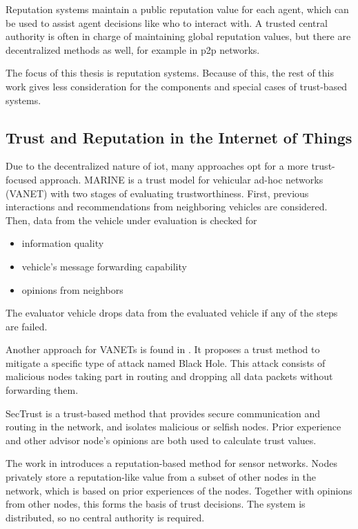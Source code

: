 \documentclass[%
    ]{\PathToTumTemplate/thesis/tum_thesis}
\begin{document}
Reputation systems maintain a public reputation value for each agent, which can be used to assist agent decisions like who to interact with.
A trusted central authority is often in charge of maintaining global reputation values, but there are decentralized methods as well, for example in \gls{p2p} networks\cite{kamvar_eigentrust_2003,kurdi_honestpeer_2015,keshavarz_uastrustchain_2020}.

The focus of this thesis is reputation systems.
Because of this, the rest of this work gives less consideration for the components and special cases of trust-based systems.



\subsection{Trust and Reputation in the Internet of Things}

Due to the decentralized nature of \gls{iot}, many approaches opt for a more trust-focused approach.
MARINE is a trust model for vehicular ad-hoc networks (VANET) with two stages of evaluating trustworthiness\cite{ahmad_marine_2020}.
First, previous interactions and recommendations from neighboring vehicles are considered.
Then, data from the vehicle under evaluation is checked for
\begin{itemize}
\item information quality
\item vehicle’s message forwarding capability
\item opinions from neighbors
\end{itemize}
The evaluator vehicle drops data from the evaluated vehicle if any of the steps are failed.

Another approach for VANETs is found in \cite{primiero_simulation_2018}.
It proposes a trust method to mitigate a specific type of attack named Black Hole.
This attack consists of malicious nodes taking part in routing and dropping all data packets without forwarding them.

SecTrust is a trust-based method that provides secure communication and routing in the network, and isolates malicious or selfish nodes\cite{airehrour_trust-based_2017}.
Prior experience and other advisor node's opinions are both used to calculate trust values.

The work in \cite{ganeriwal_reputation-based_2008} introduces a reputation-based method for sensor networks.
Nodes privately store a reputation-like value from a subset of other nodes in the network, which is based on prior experiences of the nodes.
Together with opinions from other nodes, this forms the basis of trust decisions.
The system is distributed, so no central authority is required.
\end{document}
